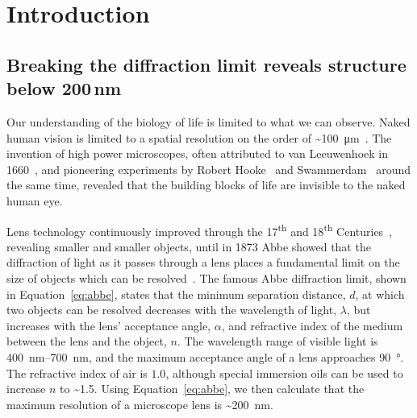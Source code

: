 
\chapter{Introduction}  %

\ifpdf
    \graphicspath{{Chapter1/Figs/Raster/}{Chapter1/Figs/PDF/}{Chapter1/Figs/}}
\else
    \graphicspath{{Chapter1/Figs/Vector/}{Chapter1/Figs/}}
\fi

\section{Breaking the diffraction limit reveals structure below 200\,nm}
Our understanding of the biology of life is limited to what we can observe. 
Naked human vision is limited to a spatial resolution on the order of \textasciitilde\SI{100}{\micro\metre}~\cite{devalois1990spatial}.
The invention of high power microscopes, often attributed to van Leeuwenhoek in 1660~\cite{van1800select}, and pioneering experiments by Robert Hooke~\cite{hooke1667micrographia} and Swammerdam~\cite{swammerdam1758book} around the same time, revealed that the building blocks of life are invisible to the naked human eye. 

Lens technology continuously improved through the 17\textsuperscript{th} and 18\textsuperscript{th} Centuries~\cite{dollond1753xiv, daumas1972scientific}, revealing smaller and smaller objects, until in 1873 Abbe showed that the diffraction of light as it passes through a lens places a fundamental limit on the size of objects which can be resolved~\cite{abbe1873beitrage}. The famous Abbe diffraction limit, shown in Equation~\ref{eq:abbe}, states that the minimum separation distance, $d$, at which two objects can be resolved decreases with the wavelength of light, $\lambda$, but increases with the lens' acceptance angle, $\alpha$, and refractive index of the medium between the lens and the object, $n$. The wavelength range of visible light is \SIrange[range-phrase=--]{400}{700}{\nano\metre}, and the maximum acceptance angle of a lens approaches \SI{90}{\degree}. The refractive index of air is $1.0$, although special immersion oils can be used to increase $n$ to \textasciitilde\num{1.5}. Using Equation~\ref{eq:abbe}, we then calculate that the maximum resolution of a microscope lens is \textasciitilde\SI{200}{\nano\metre}. 

